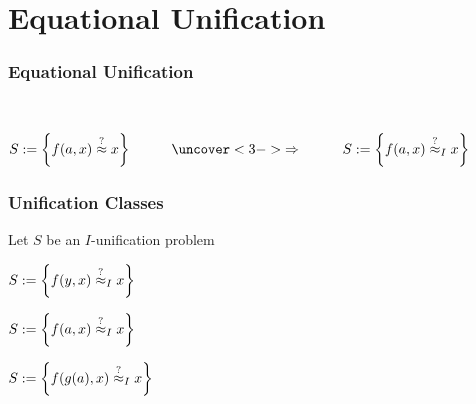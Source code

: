 \section{Equational Unification}
\begin{frame}
\frametitle{Equational Unification}
\\
\begin{center}
$S:=\left\lbrace f(a,x)\approxq x\right\rbrace\hspace{1cm}\uncover<3->{ \Rightarrow \hspace{1cm}S:=\left\lbrace f(a,x)\approxq_I x\right\rbrace}$
\end{center}
\end{frame}
\begin{frame}
\frametitle{Unification Classes}
Let $S$ be an $I$-unification problem

\begin{description}
\setlength{\itemsep}{15pt}
\item[\textbf{elementary}:] $S:=\left\lbrace f(y,x)\stackrel{?}{\approx}_I x\right\rbrace$
\item[with \textbf{constants}:] $S:=\left\lbrace f(a,x)\stackrel{?}{\approx}_I x\right\rbrace$
\item[\textbf{general}:] $S:=\left\lbrace f(g(a),x)\stackrel{?}{\approx}_I x\right\rbrace$
\end{description}
\end{frame}

